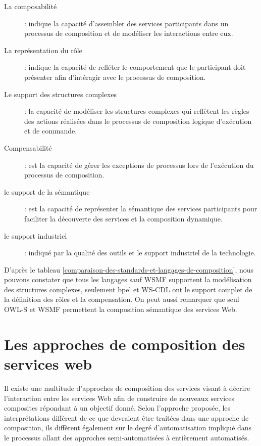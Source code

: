   \renewcommand{\descriptionlabel}[1]{\hspace{0.5cm}\textbullet~\textsf{#1}}
  \begin{description}
  \item [La composabilité]: indique la capacité d'assembler des
    services participants dans un processus de composition et de
    modéliser les interactions entre eux.

  \item [La représentation du rôle]: indique la capacité de refléter
    le comportement que le participant doit présenter afin d'intéragir
    avec le processus de composition.

  \item [Le support des structures complexes]: la capacité de
    modéliser les structures complexes qui reflètent les règles des
    actions réalisées dans le processus de composition logique
    d'exécution et de commande.

  \item [Compensabilité]: est la capacité de gérer les exceptions de
    processus lors de l'exécution du processus de composition.

  \item [le support de la sémantique]: est la capacité de représenter la
    sémantique des services participants pour faciliter la découverte
    des services et la composition dynamique.

  \item [le support industriel]: indiqué par la qualité des outils et
    le support industriel de la technologie.
  \end{description}
  \enddescription

  D'après le tableau
  \ref{comparaison-des-standards-et-langages-de-composition}, nous
  pouvons constater que tous les langages sauf \textsc{WSMF}
  supportent la modélisation des structures complexes, seulement
  \acrshort{bpel} et \textsc{WS-CDL} ont le support complet de la
  définition des rôles et la compensation. On peut aussi remarquer que
  seul \textsc{OWL-S} et \textsc{WSMF} permettent la
  composition sémantique des services Web.

  \section{Les approches de composition des services web}
  \label{sec:comp-dynam}
  Il existe une multitude d'approches de composition des
  services visant à décrire l'interaction entre les services Web afin de
  construire de nouveaux services composites répondant à un objectif donné.
  Selon l'approche proposée, les interprétations différent de ce que devraient être
  traitées dans une approche de composition, ils diffèrent également
  sur le degré d'automatisation impliqué dans le processus allant des
  approches semi-automatisées à entièrement automatisés.\medskip

